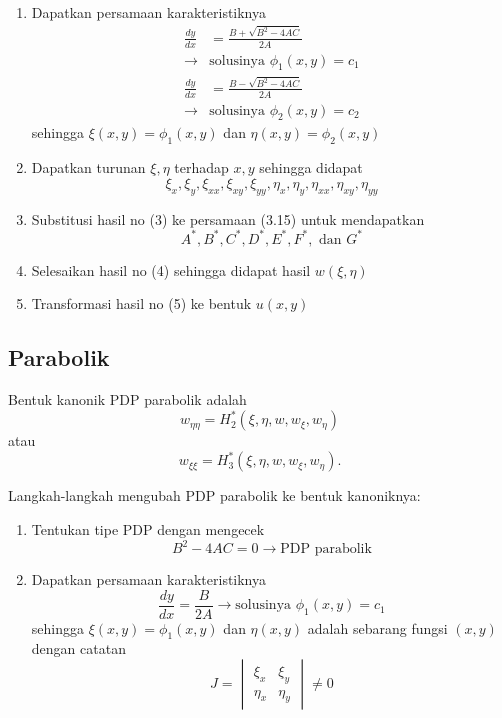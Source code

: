 \documentclass[a4paper,extrafontsizes, 9pt]{memoir}
\begin{document}
\begin{multicols}{3}
\begin{enumerate}
    \item Dapatkan persamaan karakteristiknya
    \begin{align*}
        \frac{dy}{dx} &= \frac{B + \sqrt{B^2 - 4AC}}{2A} \\\rightarrow& \text{solusinya } \phi_1(x,y) = c_1 \\
        \frac{dy}{dx} &= \frac{B - \sqrt{B^2 - 4AC}}{2A} \\\rightarrow& \text{solusinya } \phi_2(x,y) = c_2
    \end{align*}
    sehingga \( \xi(x,y) = \phi_1(x,y) \) dan \( \eta(x,y) = \phi_2(x,y) \)

    \item Dapatkan turunan \( \xi, \eta \) terhadap \( x, y \) sehingga didapat
    \[
    \xi_x, \xi_y, \xi_{xx}, \xi_{xy}, \xi_{yy}, \eta_x, \eta_y, \eta_{xx}, \eta_{xy}, \eta_{yy}
    \]

    \item Substitusi hasil no (3) ke persamaan (3.15) untuk mendapatkan
    \[
    A^*, B^*, C^*, D^*, E^*, F^*, \text{ dan } G^*
    \]

    \item Selesaikan hasil no (4) sehingga didapat hasil
    $
    w(\xi, \eta)
    $

    \item Transformasi hasil no (5) ke bentuk
    $
    u(x, y)
    $
\end{enumerate}
\subsection*{\small Parabolik}
    Bentuk kanonik PDP parabolik adalah
\[
w_{\eta\eta} = H_2^*(\xi, \eta, w, w_\xi, w_\eta)
\]
atau
\[
w_{\xi\xi} = H_3^*(\xi, \eta, w, w_\xi, w_\eta).
\]

Langkah-langkah mengubah PDP parabolik ke bentuk kanoniknya:

\begin{enumerate}
    \item Tentukan tipe PDP dengan mengecek
    \[
    B^2 - 4AC = 0 \rightarrow \text{PDP parabolik}
    \]

    \item Dapatkan persamaan karakteristiknya
    \[
    \frac{dy}{dx} = \frac{B}{2A} \rightarrow \text{solusinya } \phi_1(x,y) = c_1
    \]
    sehingga \( \xi(x,y) = \phi_1(x,y) \) dan \( \eta(x,y) \) adalah sebarang fungsi \( (x,y) \) dengan catatan
    \[
    J = 
    \begin{vmatrix}
        \xi_x & \xi_y \\
        \eta_x & \eta_y
    \end{vmatrix} \ne 0
    \]


\end{enumerate}
\end{multicols}
\end{document}
